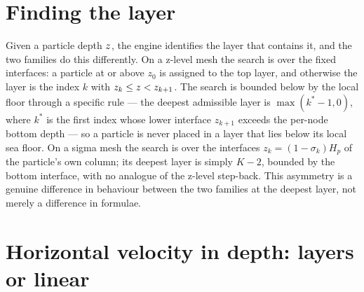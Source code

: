 \section{Finding the layer}\label{sec:vert-layer}

Given a particle depth $z$, the engine identifies the layer that contains it, and the two families
do this differently. On a z-level mesh the search is over the fixed interfaces: a particle at or above
$z_0$ is assigned to the top layer, and otherwise the layer is the index $k$ with
$z_k\le z<z_{k+1}$. The search is bounded below by the local floor through a specific rule --- the
deepest admissible layer is $\max(k^\ast-1,0)$, where $k^\ast$ is the first index whose lower interface
$z_{k+1}$ exceeds the per-node bottom depth --- so a particle is never placed in a layer that lies below
its local sea floor. On a sigma mesh the search is over the interfaces $z_k=(1-\sigma_k)H_p$ of the
particle's own column; its deepest layer is simply $K-2$, bounded by the bottom interface, with no
analogue of the z-level step-back. This asymmetry is a genuine difference in behaviour between the two
families at the deepest layer, not merely a difference in formulae.


\section{Horizontal velocity in depth: layers or linear}\label{sec:vert-uvdepth}


